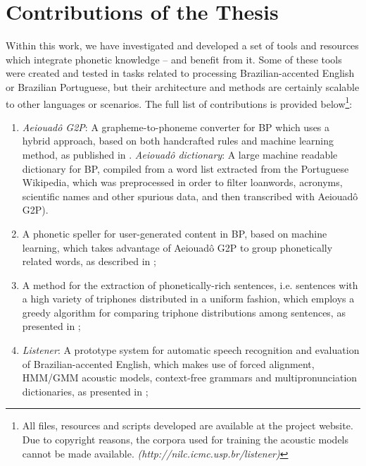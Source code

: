   
\section*{Contributions of the Thesis} 

Within this work, we have investigated and developed a set of tools and resources which integrate phonetic knowledge -- and benefit from it. Some of these tools were created and tested in tasks related to processing Brazilian-accented English or Brazilian Portuguese, but their architecture and methods are certainly scalable to other languages or scenarios. The full list of contributions is provided below\footnote{All files, resources and scripts developed are available at the project website. Due to copyright reasons, the corpora used for training the acoustic models cannot be made available.  \emph{(http://nilc.icmc.usp.br/listener)}}:

\begin{enumerate}
 \item \emph{Aeiouad\^o G2P}: A grapheme-to-phoneme converter for \ac{BP} which uses a hybrid approach, based on both handcrafted rules and machine learning method, as published in \citeauthor{Mendonca2014} \cite{Mendonca2014}. \emph{Aeiouad\^o dictionary}: A large machine readable dictionary for \ac{BP}, compiled from a word list extracted from the Portuguese Wikipedia, which was preprocessed in order to filter loanwords, acronyms, scientific names and other spurious data, and then transcribed with Aeiouad\^o G2P).
 \item A phonetic speller for user-generated content in \ac{BP}, based on machine learning, which takes advantage of Aeiouad\^o G2P to group phonetically related words, as described in \citeauthor{Mendonca2015} \cite{Mendonca2015}; 
 \item A method for the extraction of phonetically-rich sentences, i.e. sentences with a high variety of triphones distributed in a uniform fashion, which employs a greedy algorithm for comparing triphone distributions among sentences, as presented in \citeauthor{Mendonca2014b} \cite{Mendonca2014b};
 \item \emph{Listener}: A prototype system for automatic speech recognition and evaluation of Brazilian-accented English, which makes use of forced alignment, \ac{HMM}/\ac{GMM} acoustic models, context-free grammars and multipronunciation dictionaries, as presented in \citeauthor{Mendonca2016} \cite{Mendonca2016};
\end{enumerate}

